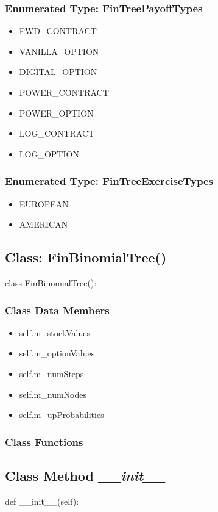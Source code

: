 \documentclass[twoside,11pt]{book}
\begin{document}
\subsubsection{Enumerated Type: FinTreePayoffTypes}
\begin{itemize}
\item{FWD\_CONTRACT}
\item{VANILLA\_OPTION}
\item{DIGITAL\_OPTION}
\item{POWER\_CONTRACT}
\item{POWER\_OPTION}
\item{LOG\_CONTRACT}
\item{LOG\_OPTION}
\end{itemize}

\subsubsection{Enumerated Type: FinTreeExerciseTypes}
\begin{itemize}
\item{EUROPEAN}
\item{AMERICAN}
\end{itemize}

\subsection{Class: FinBinomialTree()}
class FinBinomialTree():

\subsubsection{Class Data Members}
\begin{itemize}
\item{self.m\_stockValues}
\item{self.m\_optionValues}
\item{self.m\_numSteps}
\item{self.m\_numNodes}
\item{self.m\_upProbabilities}
\end{itemize}

\subsubsection{Class Functions}

\subsection{Class Method {\it \_\_init\_\_}}
def \_\_init\_\_(self):
\end{document}

